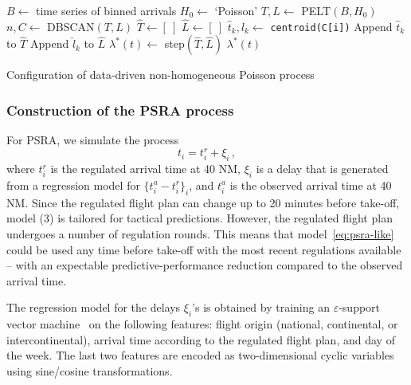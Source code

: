 \documentclass[draft,review]{elsarticle}
\begin{document}
\begin{algorithm}
\begin{algorithmic}[1]
    \STATE \(B \leftarrow \) time series of binned arrivals
    \STATE \(H_0 \leftarrow \) `Poisson'
    \STATE \(T, L \leftarrow \) PELT\((B, H_0)\)
    \STATE \(n, C \leftarrow \) DBSCAN\((T, L)\)
    \STATE {}
    \STATE \(\hat{T} \leftarrow [~] \)
    \STATE \(\hat{L} \leftarrow [~] \)
        \STATE \(\hat{t}_k, \hat{l}_k \leftarrow \) \texttt{centroid(C[i])}
        \STATE Append \(\hat{t}_k\) to \(\hat{T}\)
        \STATE Append \(\hat{l}_k\) to \(\hat{L}\)
    \ENDFOR
    \STATE \(\lambda^\ast(t) \leftarrow \) step\((\hat{T}, \hat{L})\)
    \RETURN \(\lambda^\ast(t)\)
\end{algorithmic}
\caption{Configuration of data-driven non-homogeneous Poisson process}\label{Alg:POISSON}
\end{algorithm}

\subsubsection{Construction of the \acs{PSRA} process}\label{sec:dm_psra}

For \ac{PSRA}, we simulate the process
\begin{equation}
\label{eq:psra-like}
t_i = t^{r}_i + \xi_i \,,
\end{equation}
where \(t^{r}_i\) is the regulated arrival time at 40 NM, \(\xi_i\) is a delay that is generated from a regression model for \(\{t^{a}_i - t^{r}_i\}_i\), and \(t^{a}_i\) is the observed arrival time at 40 NM.
Since the regulated flight plan can change up to 20 minutes before take-off, model (3) is tailored for tactical predictions. However, the regulated flight plan undergoes a number of regulation rounds.
This means that model~\eqref{eq:psra-like} could be used any time before take-off with the most recent regulations available -- with an expectable predictive-performance reduction compared to the observed arrival time.

The regression model for the delays \(\xi_i\)'s is obtained by training an \(\varepsilon\)-support vector machine~\citep{cristianini2000introduction} on the following features: flight origin (national, continental, or intercontinental), arrival time according to the regulated flight plan, and day of the week.
The last two features are encoded as two-dimensional cyclic variables using sine/cosine transformations.
\end{document}
